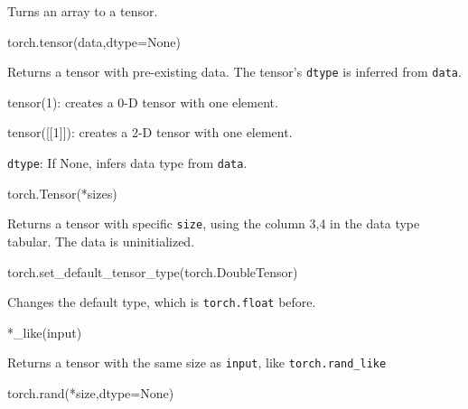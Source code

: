 \documentclass[
]{article}
\newenvironment{Shaded}{}{}
\newcommand{\BuiltInTok}[1]{#1}
\newcommand{\NormalTok}[1]{#1}
\newcommand{\OperatorTok}[1]{\textcolor[rgb]{0.40,0.40,0.40}{#1}}
\newcommand{\VariableTok}[1]{\textcolor[rgb]{0.10,0.09,0.49}{#1}}
\begin{document}
Turns an array to a tensor.

\begin{Shaded}
\begin{Highlighting}[]
\NormalTok{torch.tensor(data,dtype}\OperatorTok{=}\VariableTok{None}\NormalTok{)}
\end{Highlighting}
\end{Shaded}

Returns a tensor with pre-existing data. The tensor's \texttt{dtype} is
inferred from \texttt{data}.

tensor(1): creates a 0-D tensor with one element.

tensor({[}{[}1{]}{]}): creates a 2-D tensor with one element.

\texttt{dtype}: If None, infers data type from \texttt{data}.

\begin{Shaded}
\begin{Highlighting}[]
\NormalTok{torch.Tensor(}\OperatorTok{*}\NormalTok{sizes)}
\end{Highlighting}
\end{Shaded}

Returns a tensor with specific \texttt{size}, using the column 3,4 in
the data type tabular. The data is uninitialized.

\begin{Shaded}
\begin{Highlighting}[]
\NormalTok{torch.set\_default\_tensor\_type(torch.DoubleTensor)}
\end{Highlighting}
\end{Shaded}

Changes the default type, which is \texttt{torch.float} before.

\begin{Shaded}
\begin{Highlighting}[]
\OperatorTok{*}\NormalTok{\_like(}\BuiltInTok{input}\NormalTok{)}
\end{Highlighting}
\end{Shaded}

Returns a tensor with the same size as \texttt{input}, like
\texttt{torch.rand\_like}

\begin{Shaded}
\begin{Highlighting}[]
\NormalTok{torch.rand(}\OperatorTok{*}\NormalTok{size,dtype}\OperatorTok{=}\VariableTok{None}\NormalTok{)}
\end{Highlighting}
\end{Shaded}
\end{document}
